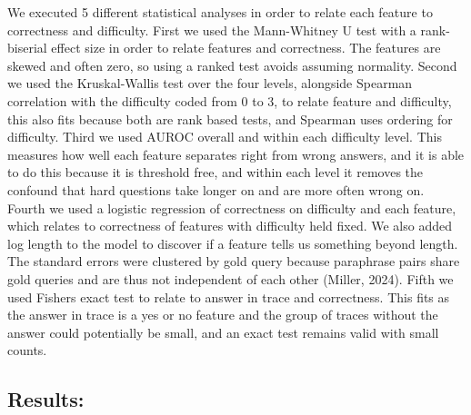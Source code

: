 We executed 5 different statistical analyses in order to relate each feature to correctness and difficulty. First we used the Mann-Whitney U test with a rank-biserial effect size in order to relate features and correctness. The features are skewed and often zero, so using a ranked test avoids assuming normality. Second we used the Kruskal-Wallis test over the four levels, alongside Spearman correlation with the difficulty coded from 0 to 3, to relate feature and difficulty, this also fits because both are rank based tests, and Spearman uses ordering for difficulty. Third we used AUROC overall and within each difficulty level. This measures how well each feature separates right from wrong answers, and it is able to do this because it is threshold free, and within each level it removes the confound that hard questions take longer on and are more often wrong on. Fourth we used a logistic regression of correctness on difficulty and each feature, which relates to correctness of features with difficulty held fixed. We also added log length to the model to discover if a feature tells us something beyond length. The standard errors were clustered by gold query because paraphrase pairs share gold queries and are thus not independent of each other (Miller, 2024). Fifth we used Fisher\textquotesingle s exact test to relate to answer in trace and correctness. This fits as the answer in trace is a yes or no feature and the group of traces without the answer could potentially be small, and an exact test remains valid with small counts.

\FloatBarrier
\subsection*{Results:}


